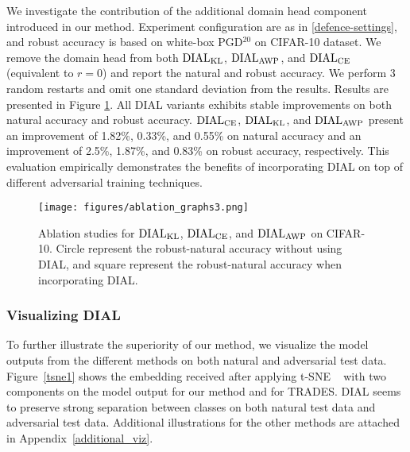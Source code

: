 We investigate the contribution of the additional domain head component introduced in our method. Experiment configuration are as in \ref{defence-settings}, and robust accuracy is based on white-box PGD$^{20}$ on CIFAR-10 dataset. We remove the domain head from both $\operatorname{DIAL}_{\operatorname{KL}}$, $\operatorname{DIAL}_{\operatorname{AWP}}$, and $\operatorname{DIAL}_{\operatorname{CE}}$ (equivalent to $r=0$) and report the natural and robust accuracy. We perform 3 random restarts and omit one standard deviation from the results. Results are presented in Figure \ref{ablation}. All DIAL variants exhibits stable improvements on both natural accuracy and robust accuracy. $\operatorname{DIAL}_{\operatorname{CE}}$, $\operatorname{DIAL}_{\operatorname{KL}}$, and $\operatorname{DIAL}_{\operatorname{AWP}}$ present an improvement of 1.82\%, 0.33\%, and 0.55\% on natural accuracy and an improvement of 2.5\%, 1.87\%, and 0.83\% on robust accuracy, respectively. This evaluation empirically demonstrates the benefits of incorporating DIAL on top of different adversarial training techniques.

\begin{figure}[ht]
  \centering
  \texttt{[image: figures/ablation\_graphs3.png]}
  \caption{Ablation studies for $\operatorname{DIAL}_{\operatorname{KL}}$, $\operatorname{DIAL}_{\operatorname{CE}}$, and $\operatorname{DIAL}_{\operatorname{AWP}}$ on CIFAR-10. Circle represent the robust-natural accuracy without using DIAL, and square represent the robust-natural accuracy when incorporating DIAL.
  }
  \label{ablation}
\end{figure}

\subsubsection{Visualizing DIAL}
To further illustrate the superiority of our method, we visualize the model outputs from the different methods on both natural and adversarial test data.
Figure~\ref{tsne1} shows the embedding received after applying t-SNE ~\citep{van2008visualizing} with two components on the model output for our method and for TRADES. DIAL seems to preserve strong separation between classes on both natural test data and adversarial test data. Additional illustrations for the other methods are attached in Appendix~\ref{additional_viz}. 

